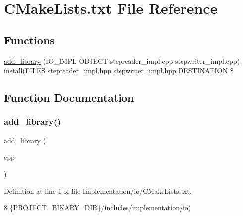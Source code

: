\hypertarget{Implementation_2io_2CMakeLists_8txt}{}\section{C\+Make\+Lists.\+txt File Reference}
\label{Implementation_2io_2CMakeLists_8txt}
\subsection*{Functions}
\begin{DoxyCompactItemize}
\item 
\hyperlink{Implementation_2io_2CMakeLists_8txt_afe4d3211083e85c7f70408064daae902}{add\+\_\+library} (I\+O\+\_\+\+I\+M\+PL O\+B\+J\+E\+CT stepreader\+\_\+impl.\+cpp stepwriter\+\_\+impl.\+cpp) install(F\+I\+L\+ES stepreader\+\_\+impl.\+hpp stepwriter\+\_\+impl.\+hpp D\+E\+S\+T\+I\+N\+A\+T\+I\+ON \$
\end{DoxyCompactItemize}


\subsection{Function Documentation}
\mbox{\label{Implementation_2io_2CMakeLists_8txt_afe4d3211083e85c7f70408064daae902}} 
\subsubsection{\texorpdfstring{add\+\_\+library()}{add\_library()}}
{\footnotesize\ttfamily add\+\_\+library (\begin{DoxyParamCaption}\item[{I\+O\+\_\+\+I\+M\+PL O\+B\+J\+E\+CT stepreader\+\_\+impl.\+cpp stepwriter\+\_\+impl.}]{cpp }\end{DoxyParamCaption})}



Definition at line 1 of file Implementation/io/\+C\+Make\+Lists.\+txt.


\begin{DoxyCode}
8                \{PROJECT\_BINARY\_DIR\}/includes/implementation/io)
\end{DoxyCode}
